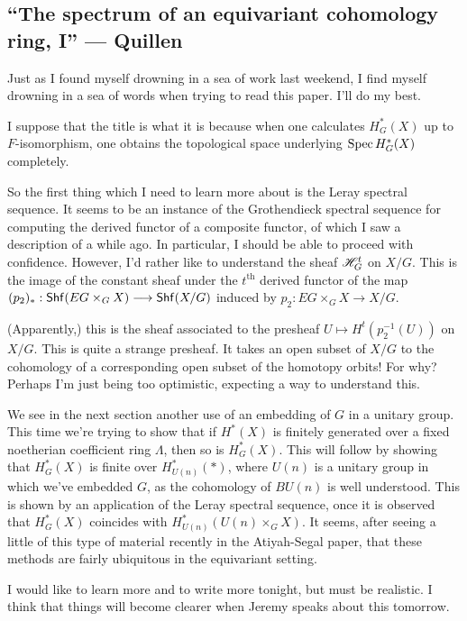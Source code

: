 \documentclass[11pt]{article}
\newcommand{\KanSemResponse}[1]
{
\thispagestyle{fancy}
\subsection*{#1}
}
\begin{document}
\begin{QuillenSpectrumOfEqCohomology}
\KanSemResponse
{``The spectrum of an equivariant cohomology ring, I'' --- Quillen}
Just as I found myself drowning in a sea of work last weekend, I find myself drowning in a sea of words when trying to read this paper. I'll do my best.

I suppose that the title is what it is because when one calculates $H^*_G(X)$ up to $F$-isomorphism, one obtains the topological space underlying $\operatorname{Spec} H^*_G(X)$ completely.

So the first thing which I need to learn more about is the Leray spectral sequence. It seems to be an instance of the Grothendieck spectral sequence for computing the derived functor of a composite functor, of which I saw a description of a while ago. In particular, I should be able to proceed with confidence. However, I'd rather like to understand the sheaf $\mathscr{H}_G^t$ on $X/G$. This is the image of the constant sheaf under the $t^\text{th}$ derived functor of the map $(p_2)_*:\operatorname{{\mathsf{Shf}}}(EG\times_G X)\longrightarrow \operatorname{{\mathsf{Shf}}}(X/G)$ induced by $p_2:EG\times_G X\to X/G$.

(Apparently,) this is the sheaf associated to the presheaf $U\mapsto H^t(p_2^{-1}(U))$ on $X/G$. This is quite a strange presheaf. It takes an open subset of $X/G$ to the cohomology of a corresponding open subset of the homotopy orbits! For why? Perhaps I'm just being too optimistic, expecting a way to understand this.

We see in the next section another use of an embedding of $G$ in a unitary group. This time we're trying to show that if $H^*(X)$ is finitely generated over a fixed noetherian coefficient ring $\Lambda$, then so is $H^*_G(X)$. This will follow by showing that $H^*_G(X)$ is finite over  $H^*_{U(n)}(\ast)$, where $U(n)$ is a unitary group in which we've embedded $G$, as the cohomology of $BU(n)$ is well understood. This is shown by an application of the Leray spectral sequence, once it is observed that $H^*_G(X)$ coincides with $H^*_{U(n)}(U(n)\times_G X)$. It seems, after seeing a little of this type of material recently in the Atiyah-Segal paper, that these methods are fairly ubiquitous in the equivariant setting.

I would like to learn more and to write more tonight, but must be realistic. I think that things will become clearer when Jeremy speaks about this tomorrow.

\pagebreak
\end{QuillenSpectrumOfEqCohomology}
\end{document}
